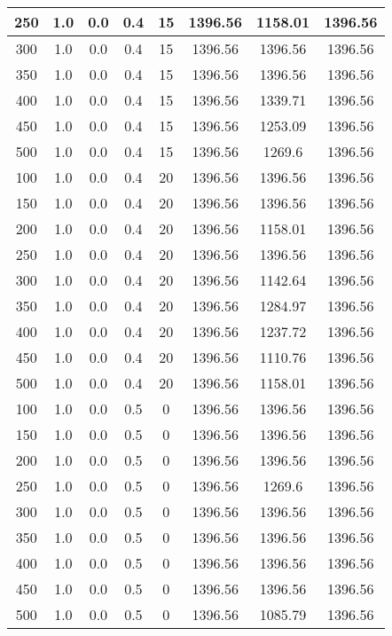 \documentclass[a4paper, 12pt]{extreport}
\begin{document}
\begin{itemize}
\begin{longtable}{|c|c|c|c|c|c|c|c|}
			250 & 1.0 & 0.0 & 0.4 & 15 & 1396.56 & 1158.01 & 1396.56 \\\hline
			300 & 1.0 & 0.0 & 0.4 & 15 & 1396.56 & 1396.56 & 1396.56 \\\hline
			350 & 1.0 & 0.0 & 0.4 & 15 & 1396.56 & 1396.56 & 1396.56 \\\hline
			400 & 1.0 & 0.0 & 0.4 & 15 & 1396.56 & 1339.71 & 1396.56 \\\hline
			450 & 1.0 & 0.0 & 0.4 & 15 & 1396.56 & 1253.09 & 1396.56 \\\hline
			500 & 1.0 & 0.0 & 0.4 & 15 & 1396.56 & 1269.6 & 1396.56 \\\hline
			100 & 1.0 & 0.0 & 0.4 & 20 & 1396.56 & 1396.56 & 1396.56 \\\hline
			150 & 1.0 & 0.0 & 0.4 & 20 & 1396.56 & 1396.56 & 1396.56 \\\hline
			200 & 1.0 & 0.0 & 0.4 & 20 & 1396.56 & 1158.01 & 1396.56 \\\hline
			250 & 1.0 & 0.0 & 0.4 & 20 & 1396.56 & 1396.56 & 1396.56 \\\hline
			300 & 1.0 & 0.0 & 0.4 & 20 & 1396.56 & 1142.64 & 1396.56 \\\hline
			350 & 1.0 & 0.0 & 0.4 & 20 & 1396.56 & 1284.97 & 1396.56 \\\hline
			400 & 1.0 & 0.0 & 0.4 & 20 & 1396.56 & 1237.72 & 1396.56 \\\hline
			450 & 1.0 & 0.0 & 0.4 & 20 & 1396.56 & 1110.76 & 1396.56 \\\hline
			500 & 1.0 & 0.0 & 0.4 & 20 & 1396.56 & 1158.01 & 1396.56 \\\hline
			100 & 1.0 & 0.0 & 0.5 & 0 & 1396.56 & 1396.56 & 1396.56 \\\hline
			150 & 1.0 & 0.0 & 0.5 & 0 & 1396.56 & 1396.56 & 1396.56 \\\hline
			200 & 1.0 & 0.0 & 0.5 & 0 & 1396.56 & 1396.56 & 1396.56 \\\hline
			250 & 1.0 & 0.0 & 0.5 & 0 & 1396.56 & 1269.6 & 1396.56 \\\hline
			300 & 1.0 & 0.0 & 0.5 & 0 & 1396.56 & 1396.56 & 1396.56 \\\hline
			350 & 1.0 & 0.0 & 0.5 & 0 & 1396.56 & 1396.56 & 1396.56 \\\hline
			400 & 1.0 & 0.0 & 0.5 & 0 & 1396.56 & 1396.56 & 1396.56 \\\hline
			450 & 1.0 & 0.0 & 0.5 & 0 & 1396.56 & 1396.56 & 1396.56 \\\hline
			500 & 1.0 & 0.0 & 0.5 & 0 & 1396.56 & 1085.79 & 1396.56 \\\hline

\end{longtable}
\end{itemize}
\end{document}
